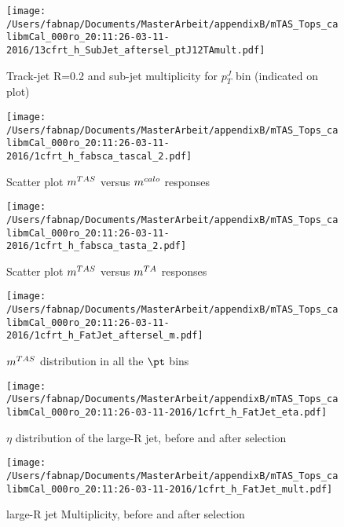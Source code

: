 \begin{figure}

\texttt{[image: /Users/fabnap/Documents/MasterArbeit/appendixB/mTAS\_Tops\_calibmCal\_000ro\_20:11:26-03-11-2016/13cfrt\_h\_SubJet\_aftersel\_ptJ12TAmult.pdf]}
\caption{Track-jet R=0.2 and sub-jet multiplicity for $p_{T}^{J}$ bin (indicated on plot) }

\end{figure}

\clearpage %

\begin{figure}

\texttt{[image: /Users/fabnap/Documents/MasterArbeit/appendixB/mTAS\_Tops\_calibmCal\_000ro\_20:11:26-03-11-2016/1cfrt\_h\_fabsca\_tascal\_2.pdf]}
\caption{Scatter plot $m^{TAS}$ versus $m^{calo}$ responses}

\end{figure}
 
\begin{figure}
 
\texttt{[image: /Users/fabnap/Documents/MasterArbeit/appendixB/mTAS\_Tops\_calibmCal\_000ro\_20:11:26-03-11-2016/1cfrt\_h\_fabsca\_tasta\_2.pdf]}
\caption{Scatter plot $m^{TAS}$ versus $m^{TA}$ responses}
 
\end{figure}
 
\begin{figure}
 
\texttt{[image: /Users/fabnap/Documents/MasterArbeit/appendixB/mTAS\_Tops\_calibmCal\_000ro\_20:11:26-03-11-2016/1cfrt\_h\_FatJet\_aftersel\_m.pdf]}
\caption{$m^{TAS}$ distribution in all the $\pt$ bins}
 
\end{figure}
 
\begin{figure}
 
\texttt{[image: /Users/fabnap/Documents/MasterArbeit/appendixB/mTAS\_Tops\_calibmCal\_000ro\_20:11:26-03-11-2016/1cfrt\_h\_FatJet\_eta.pdf]}
\caption{$\eta$ distribution of the large-R jet, before and after selection}
 
\end{figure}

\begin{figure}
 
\texttt{[image: /Users/fabnap/Documents/MasterArbeit/appendixB/mTAS\_Tops\_calibmCal\_000ro\_20:11:26-03-11-2016/1cfrt\_h\_FatJet\_mult.pdf]}
\caption{large-R jet Multiplicity, before and after selection}
 
\end{figure}
 
